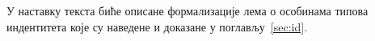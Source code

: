 \begin{code}%
\>[0]%
\>[1100I]\AgdaSymbol{:}\AgdaSpace{}%
\AgdaSymbol{\{}\AgdaSpace{}%
\AgdaSymbol{:}\AgdaSpace{}%
\AgdaSpace{}%
\AgdaSpace{}%
\AgdaSymbol{\}}\AgdaSpace{}%
\AgdaSymbol{(}\AgdaSpace{}%
\AgdaSymbol{:}\AgdaSpace{}%
\AgdaSymbol{)}\AgdaSpace{}%
\AgdaSymbol{(}\AgdaSpace{}%
\AgdaSymbol{:}\AgdaSpace{}%
\AgdaSymbol{(}\AgdaSpace{}%
\AgdaSymbol{:}\AgdaSpace{}%
\AgdaSymbol{)}\AgdaSpace{}%
\AgdaSpace{}%
\AgdaSpace{}%
\AgdaOperator{\AgdaFunction{==}}\AgdaSpace{}%
\AgdaSpace{}%
\AgdaSpace{}%
\AgdaSpace{}%
\AgdaSpace{}%
\AgdaSymbol{)}\<%
\\
\>[.][@{}l@{}]\<[1100I]%
\>[2]\AgdaSpace{}%
\AgdaSpace{}%
\AgdaSpace{}%
\AgdaSymbol{(}\AgdaSpace{}%
\AgdaSymbol{)}\AgdaSpace{}%
\AgdaSpace{}%
\AgdaSymbol{(}\AgdaSpace{}%
\AgdaSymbol{:}\AgdaSpace{}%
\AgdaSymbol{)}\AgdaSpace{}%
\AgdaSymbol{(}\AgdaSpace{}%
\AgdaSymbol{:}\AgdaSpace{}%
\AgdaSpace{}%
\AgdaOperator{\AgdaFunction{==}}\AgdaSpace{}%
\AgdaSymbol{)}\AgdaSpace{}%
\AgdaSpace{}%
\AgdaSpace{}%
\AgdaSpace{}%
\<%
\\
\>[0]\AgdaSpace{}%
\AgdaSpace{}%
\AgdaSpace{}%
\AgdaSpace{}%
\AgdaSpace{}%
\AgdaSymbol{(}\AgdaSpace{}%
\AgdaSymbol{)}\AgdaSpace{}%
\AgdaSymbol{=}\AgdaSpace{}%
\<%
\end{code}

У наставку текста биће описане формализације лема о особинама типова индентитета које су наведене и доказане у поглављу~\ref{sec:id}.


